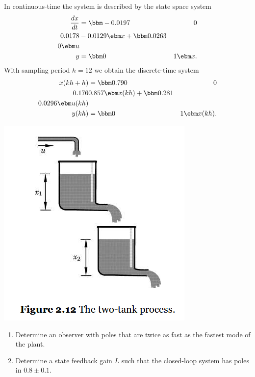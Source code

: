 \documentclass[letterpaper]{scrartcl}
\begin{document}
\begin{minipage}{0.6\linewidth}
In continuous-time the system is described by the state space system
\begin{align*}
\frac{dx}{dt} &= \bbm -0.0197 & 0\\0.0178 & -0.0129 \ebm x + \bbm 0.0263\\0 \ebm u\\
y &= \bbm 0 & 1 \ebm x.
\end{align*}
With sampling period \(h=12\) we obtain the discrete-time system
\begin{align*}
x(kh+h) &= \bbm 0.790 & 0\\ 0.176 & 0.857 \ebm x(kh) + \bbm 0.281\\ 0.0296 \ebm u(kh)\\
y(kh) &= \bbm 0 & 1 \ebm x(kh).
\end{align*}
\end{minipage}
\begin{minipage}{0.4\linewidth}
 \includegraphics[width=\linewidth]{../../figures/fig2-12-two-tank-system.png}
\end{minipage}


\begin{enumerate}
\item Determine an observer with poles that are twice as fast as the fastest mode of the plant.
\item Determine a state feedback gain \(L\) such that the closed-loop system has poles in \( 0.8 \pm 0.1\).
\end{enumerate}
\end{document}
